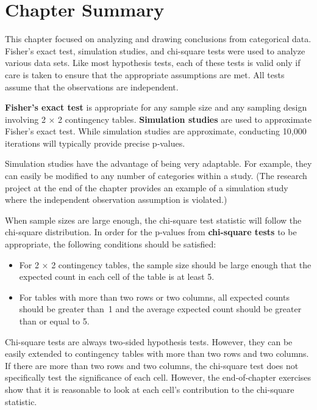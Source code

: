 \documentclass[
]{book}
\providecommand{\tightlist}{%
  \setlength{\itemsep}{0pt}\setlength{\parskip}{0pt}}
\begin{document}
\hypertarget{chapter-summary-4}{%
\section{Chapter Summary}\label{chapter-summary-4}}

This chapter focused on analyzing and drawing conclusions from categorical data. Fisher's exact test, simulation studies, and chi-square tests were used to analyze various data sets. Like most hypothesis tests, each of these tests is valid only if care is taken to ensure that the appropriate assumptions are met. All tests assume that the observations are independent.

\textbf{Fisher's exact test} is appropriate for any sample size and any sampling design involving 2 × 2 contingency tables. \textbf{Simulation studies} are used to approximate Fisher's exact test. While simulation studies are approximate, conducting 10,000 iterations will typically provide precise p‑values.

Simulation studies have the advantage of being very adaptable. For example, they can easily be modified to any number of categories within a study. (The research project at the end of the chapter provides an example of a simulation study where the independent observation assumption is violated.)

When sample sizes are large enough, the chi-square test statistic will follow the chi-square distribution. In order for the p‑values from \textbf{chi-square tests} to be appropriate, the following conditions should be satisfied:

\begin{itemize}
\tightlist
\item
  For 2 × 2 contingency tables, the sample size should be large enough that the expected count in each cell of the table is at least 5.
\item
  For tables with more than two rows or two columns, all expected counts should be greater than~1 and the average expected count should be greater than or equal to 5.
\end{itemize}

Chi-square tests are always two‑sided hypothesis tests. However, they can be easily extended to contingency tables with more than two rows and two columns. If there are more than two rows and two columns, the chi-square test does not specifically test the significance of each cell. However, the end‑of‑chapter exercises show that it is reasonable to look at each cell's contribution to the chi-square statistic.
\end{document}

